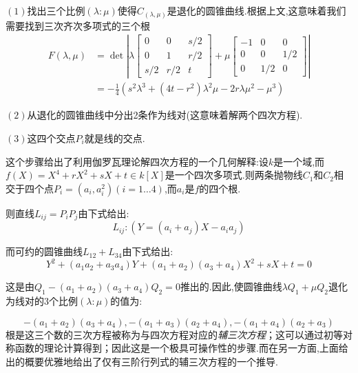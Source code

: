 \documentclass[UTF8]{book}
\begin{document}
		
		$(1)$找出三个比例$(\lambda : \mu)$使得$C_{(\lambda, \mu)}$是退化的圆锥曲线.根据上文,这意味着我们需要找到三次齐次多项式的三个根
		\begin{equation*}
			\begin{aligned} F(\lambda, \mu) &=\operatorname{det}\left|\lambda\left[\begin{array}{ccc}{0} & {0} & {s / 2} \\ {0} & {1} & {r / 2} \\ {s / 2} & {r / 2} & {t}\end{array}\right]+\mu\left[\begin{array}{ccc}{-1} & {0} & {0} \\ {0} & {0} & {1 / 2} \\ {0} & {1 / 2} & {0}\end{array}\right]\right| \\ &=-\frac{1}{4}\left(s^{2} \lambda^{3}+\left(4 t-r^{2}\right) \lambda^{2} \mu-2 r \lambda \mu^{2}-\mu^{3}\right) \end{aligned}
		\end{equation*}
		
		
		$(2)$从退化的圆锥曲线中分出2条作为线对(这意味着解两个四次方程).
		
		
		$(3)$这四个交点$P_{i}$就是线的交点.
		
		
		这个步骤给出了利用伽罗瓦理论解四次方程的一个几何解释:设$k$是一个域,而$f(X)=X^{4}+r X^{2}+s X+t \in k[X]$是一个四次多项式.则两条抛物线$C_{1}$和$C_{2}$相交于四个点$P_{i}=\left(a_{i}, a_{i}^{2}\right)(i = 1\ldots4)$,而$a_{i}$是$f$的四个根.
		
		
		则直线$L_{ij}=P_{i} P_{j}$由下式给出:
		\begin{equation*}
			L_{ij} :\left(Y=\left(a_{i}+a_{j}\right) X-a_{i} a_{j}\right)
		\end{equation*}
		
		而可约的圆锥曲线$L_{12}+L_{34}$由下式给出:
		\begin{equation*}
			Y^{2}+\left(a_{1} a_{2}+a_{3} a_{4}\right) Y+\left(a_{1}+a_{2}\right)\left(a_{3}+a_{4}\right) X^{2}+s X+t=0
		\end{equation*}
	
		这是由$Q_{1}-\left(a_{1}+a_{2}\right)\left(a_{3}+a_{4}\right) Q_{2}=0$推出的.因此,使圆锥曲线$\lambda Q_{1}+\mu Q_{2}$退化为线对的3个比例$(\lambda : \mu)$的值为:
		
		\begin{equation*}
			-\left(a_{1}+a_{2}\right)\left(a_{3}+a_{4}\right),-\left(a_{1}+a_{3}\right)\left(a_{2}+a_{4}\right),-\left(a_{1}+a_{4}\right)\left(a_{2}+a_{3}\right)
		\end{equation*}
		根是这三个数的三次方程被称为与四次方程对应的\textit{辅三次方程}；这可以通过初等对称函数的理论计算得到；因此这是一个极具可操作性的步骤.而在另一方面,上面给出的概要优雅地给出了仅有三阶行列式的辅三次方程的一个推导.
		
\end{document}
